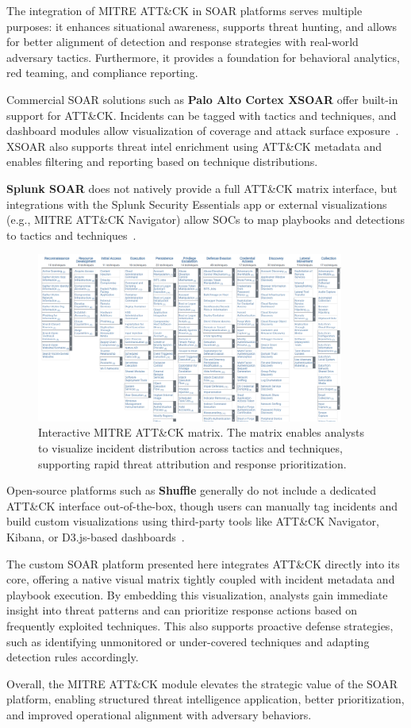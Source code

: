 The integration of MITRE ATT\&CK in SOAR platforms serves multiple purposes: it enhances situational awareness, supports threat hunting, and allows for better alignment of detection and response strategies with real-world adversary tactics. Furthermore, it provides a foundation for behavioral analytics, red teaming, and compliance reporting.

Commercial SOAR solutions such as \textbf{Palo Alto Cortex XSOAR} offer built-in support for ATT\&CK. Incidents can be tagged with tactics and techniques, and dashboard modules allow visualization of coverage and attack surface exposure~\cite{paloalto}. XSOAR also supports threat intel enrichment using ATT\&CK metadata and enables filtering and reporting based on technique distributions.

\textbf{Splunk SOAR} does not natively provide a full ATT\&CK matrix interface, but integrations with the Splunk Security Essentials app or external visualizations (e.g., MITRE ATT\&CK Navigator) allow SOCs to map playbooks and detections to tactics and techniques~\cite{splunk}.

\begin{figure}[ht]
    \centering
    \includegraphics[width=0.9\textwidth]{images/mitre_att&ck_matrix.png}
    \caption[Interactive MITRE ATT\&CK matrix]{Interactive MITRE ATT\&CK matrix. The matrix enables analysts to visualize incident distribution across tactics and techniques, supporting rapid threat attribution and response prioritization.}
    \label{fig:mitre-attck-matrix}
\end{figure}

Open-source platforms such as \textbf{Shuffle} generally do not include a dedicated ATT\&CK interface out-of-the-box, though users can manually tag incidents and build custom visualizations using third-party tools like ATT\&CK Navigator, Kibana, or D3.js-based dashboards~\cite{techtarget}.

The custom SOAR platform presented here integrates ATT\&CK directly into its core, offering a native visual matrix tightly coupled with incident metadata and playbook execution. By embedding this visualization, analysts gain immediate insight into threat patterns and can prioritize response actions based on frequently exploited techniques. This also supports proactive defense strategies, such as identifying unmonitored or under-covered techniques and adapting detection rules accordingly.

Overall, the MITRE ATT\&CK module elevates the strategic value of the SOAR platform, enabling structured threat intelligence application, better prioritization, and improved operational alignment with adversary behaviors.